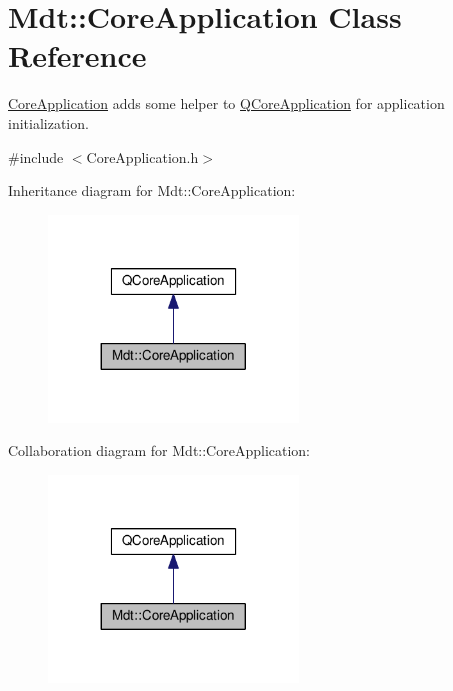 \hypertarget{class_mdt_1_1_core_application}{}\section{Mdt\+:\+:Core\+Application Class Reference}
\label{class_mdt_1_1_core_application}


\hyperlink{class_mdt_1_1_core_application}{Core\+Application} adds some helper to \hyperlink{class_q_core_application}{Q\+Core\+Application} for application initialization.  




{\ttfamily \#include $<$Core\+Application.\+h$>$}



Inheritance diagram for Mdt\+:\+:Core\+Application\+:\nopagebreak
\begin{figure}[H]
\begin{center}
\leavevmode
\includegraphics[width=188pt]{class_mdt_1_1_core_application__inherit__graph}
\end{center}
\end{figure}


Collaboration diagram for Mdt\+:\+:Core\+Application\+:\nopagebreak
\begin{figure}[H]
\begin{center}
\leavevmode
\includegraphics[width=188pt]{class_mdt_1_1_core_application__coll__graph}
\end{center}
\end{figure}
